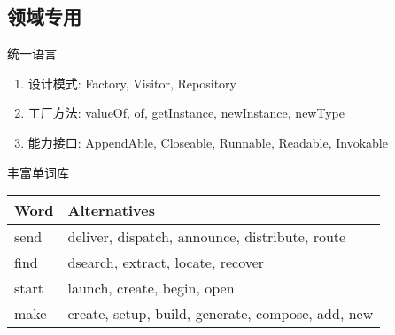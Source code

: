 \subsection{领域专用}

\begin{frame}[fragile]{统一语言}
\begin{enumerate}
  \item \alert{设计模式:} Factory, Visitor, Repository
  \item \alert{工厂方法:} valueOf, of, getInstance, newInstance, newType
  \item \alert{能力接口:} AppendAble, Closeable, Runnable, Readable, Invokable
\end{enumerate}
\end{frame}

\begin{frame}[fragile]{丰富单词库}
\begin{table}[!htb]
\begin{tabular*}{1.0\textwidth}{@{}ll@{}}
\hline
Word & Alternatives \\
\hline
send  & deliver, dispatch, announce, distribute, route \\
find & dsearch, extract, locate, recover \\ 
start & launch, create, begin, open \\
make & create, setup, build, generate, compose, add, new \\
\hline
\end{tabular*}
\end{table}
\end{frame}
